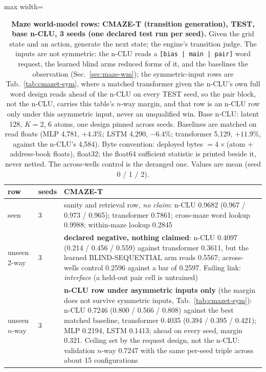 \documentclass{article} %
\begin{document}
\begin{table}[h]
\centering\scriptsize
\caption{\textbf{Maze world-model rows: CMAZE-T (transition generation), TEST, base n-CLU, 3 seeds %
(one declared test run per seed).} Given the grid state and an action, generate the next
state; the engine's transition judge. The inputs are not symmetric: the n-CLU reads a \texttt{[bias | main |
pair]} word request, the learned blind arms reduced forms of it, and the baselines the observation
(Sec.~\ref{sec:maze-wm}); the symmetric-input rows are Tab.~\ref{tab:cmazet-sym}, where a matched
transformer given the n-CLU's own full word design reads ahead of the n-CLU on every TEST seed, so the %
pair block, not the n-CLU, carries this table's $n$-way margin, and that row is an n-CLU row only
under this asymmetric input, never an unqualified win. Base n-CLU: latent 128, $K=2$, 6 atoms, one design pinned across seeds. %
Baselines are matched on read floats (MLP 4,781, $+4.3\%$; LSTM 4,290, $-6.4\%$; transformer 5,129, %
$+11.9\%$, against the n-CLU's 4,584). %
Byte convention: deployed bytes $=4\times$(atom $+$
address-book floats), float32; the float64 sufficient statistic is printed beside it, never netted.
The across-wells control is the deranged one. Values are mean (seed 0 / 1 / 2).}
\label{tab:cmazet}\label{tab:cmaze-del}
\setlength{\tabcolsep}{2pt}
\begin{adjustbox}{max width=\linewidth}\begin{tabular}{p{1.9cm}p{1.2cm}p{10.0cm}}
\toprule
row & seeds & CMAZE-T \\
\midrule
seen & 3 & sanity and retrieval row, \emph{no claim}: n-CLU 0.9682 (0.967 / 0.973 / 0.965); transformer 0.7861; cross-maze word lookup 0.9988; within-maze lookup 0.2845 \\
unseen 2-way & 3 & \textbf{declared negative, nothing claimed}: n-CLU 0.4097 (0.214 / 0.456 / 0.559) against transformer 0.3611, but the learned BLIND-SEQUENTIAL arm reads 0.5567; across-wells control 0.2596 against a bar of 0.2597. Failing link: \emph{interface} (a held-out pair cell is untrained) \\
unseen $n$-way & 3 & \textbf{n-CLU row under asymmetric inputs only} (the margin does not survive symmetric inputs, Tab.~\ref{tab:cmazet-sym}): n-CLU 0.7246 (0.800 / 0.566 / 0.808) against the best matched baseline, transformer 0.4035 (0.394 / 0.395 / 0.421); MLP 0.2194, LSTM 0.1413; ahead on every seed, margin 0.321. Ceiling set by the request design, not the n-CLU: validation $n$-way 0.7247 with the same per-seed triple across about 15 configurations \\

\end{tabular}
\end{adjustbox}
\end{table}
\end{document}
